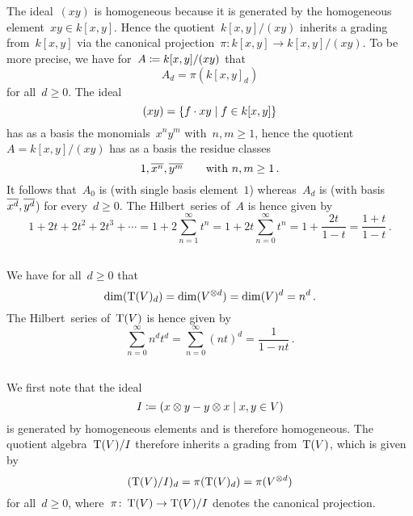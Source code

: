 \section{}





\subsection{}

The ideal~$(xy)$ is homogeneous because it is generated by the homogeneous element~$xy \in k[x,y]$.
Hence the quotient~$k[x,y]/(xy)$ inherits a grading from~$k[x,y]$ via the canonical projection~$\pi \colon k[x,y] \to k[x,y]/(xy)$.
To be more precise, we have for~$A \coloneqq k[x,y]/(xy)$ that
\[
    A_d
  = \pi(k[x,y]_d)
\]
for all~$d \geq 0$.
The ideal
\[
    (xy)
  = \{
      f \cdot xy
    \suchthat
      f \in k[x,y]
    \}
\]
has as a basis the monomials~$x^n y^m$ with~$n, m \geq 1$, hence the quotient~$A = k[x,y]/(xy)$ has as a basis the residue classes
\[
  1, \overline{x^n}, \overline{y^m}
  \qquad
  \text{with~$n, m \geq 1$} \,.
\]
It follows that~$A_0$ is  (with single basis element~$1$) whereas~$A_d$ is  (with basis~$\overline{x^d}, \overline{y^d}$) for every~$d \geq 0$.
The Hilbert~series of~$A$ is hence given by
\[
    1 + 2t + 2t^2 + 2t^3 + \dotsb
  = 1 + 2 \sum_{n=1}^\infty t^n
  = 1 + 2t \sum_{n=0}^\infty t^n
  = 1 + \frac{2t}{1-t}
  = \frac{1+t}{1-t} \,.
\]





\subsection{}

We have for all~$d \geq 0$ that
\[
    \dim(\operatorname{T}(V)_d)
  = \dim(V^{\otimes d})
  = \dim(V)^d
  = n^d \,.
\]
The Hilbert~series of~$\operatorname{T}(V)$ is hence given by
\[
    \sum_{n=0}^\infty n^d t^d
  = \sum_{n=0}^\infty (nt)^d
  = \frac{1}{1-nt} \,.
\]





\subsection{}

We first note that the {\twosided} ideal
\[
            I
  \defined  \genideal{
              x \tensor y - y \tensor x
            \suchthat
              x, y \in V
            }
\]
is generated by homogeneous elements and is therefore homogeneous.
The quotient algebra~$\operatorname{T}(V)/I$ therefore inherits a grading from~$\operatorname{T}(V)$, which is given by
\[
    ( \operatorname{T}(V)/I )_d
  = \pi( \operatorname{T}(V)_d )
  = \pi( V^{\otimes d} )
\]
for all~$d \geq 0$, where~$\pi \colon \operatorname{T}(V) \to \operatorname{T}(V)/I$ denotes the canonical projection.

